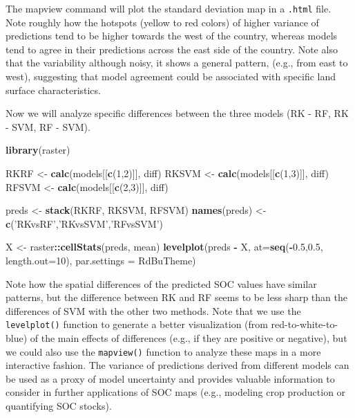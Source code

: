 \documentclass[10pt,b5paper,]{book}
\newenvironment{Shaded}{\begin{snugshade}}{\end{snugshade}}
\newcommand{\DataTypeTok}[1]{\textcolor[rgb]{0.13,0.29,0.53}{#1}}
\newcommand{\DecValTok}[1]{\textcolor[rgb]{0.00,0.00,0.81}{#1}}
\newcommand{\FloatTok}[1]{\textcolor[rgb]{0.00,0.00,0.81}{#1}}
\newcommand{\KeywordTok}[1]{\textcolor[rgb]{0.13,0.29,0.53}{\textbf{#1}}}
\newcommand{\NormalTok}[1]{#1}
\newcommand{\OperatorTok}[1]{\textcolor[rgb]{0.81,0.36,0.00}{\textbf{#1}}}
\newcommand{\StringTok}[1]{\textcolor[rgb]{0.31,0.60,0.02}{#1}}
\theoremstyle{definition}
\theoremstyle{definition}
\theoremstyle{definition}
\theoremstyle{remark}
\begin{document}
The mapview command will plot the standard deviation map in a
\texttt{.html} file. Note roughly how the hotspots (yellow to red
colors) of higher variance of predictions tend to be higher towards the
west of the country, whereas models tend to agree in their predictions
across the east side of the country. Note also that the variability
although noisy, it shows a general pattern, (e.g., from east to west),
suggesting that model agreement could be associated with specific land
surface characteristics.

Now we will analyze specific differences between the three models (RK -
RF, RK - SVM, RF - SVM).

\begin{Shaded}
\begin{Highlighting}[]
\KeywordTok{library}\NormalTok{(raster)}

\NormalTok{RKRF  <-}\StringTok{ }\KeywordTok{calc}\NormalTok{(models[[}\KeywordTok{c}\NormalTok{(}\DecValTok{1}\NormalTok{,}\DecValTok{2}\NormalTok{)]], diff)}
\NormalTok{RKSVM <-}\StringTok{ }\KeywordTok{calc}\NormalTok{(models[[}\KeywordTok{c}\NormalTok{(}\DecValTok{1}\NormalTok{,}\DecValTok{3}\NormalTok{)]], diff)}
\NormalTok{RFSVM <-}\StringTok{ }\KeywordTok{calc}\NormalTok{(models[[}\KeywordTok{c}\NormalTok{(}\DecValTok{2}\NormalTok{,}\DecValTok{3}\NormalTok{)]], diff)}

\NormalTok{preds <-}\StringTok{ }\KeywordTok{stack}\NormalTok{(RKRF, RKSVM, RFSVM)}
\KeywordTok{names}\NormalTok{(preds) <-}\StringTok{ }\KeywordTok{c}\NormalTok{(}\StringTok{'RKvsRF'}\NormalTok{,}\StringTok{'RKvsSVM'}\NormalTok{,}\StringTok{'RFvsSVM'}\NormalTok{)}

\NormalTok{X <-}\StringTok{ }\NormalTok{raster}\OperatorTok{::}\KeywordTok{cellStats}\NormalTok{(preds, mean)}
\KeywordTok{levelplot}\NormalTok{(preds }\OperatorTok{-}\StringTok{ }\NormalTok{X, }\DataTypeTok{at=}\KeywordTok{seq}\NormalTok{(}\OperatorTok{-}\FloatTok{0.5}\NormalTok{,}\FloatTok{0.5}\NormalTok{, }\DataTypeTok{length.out=}\DecValTok{10}\NormalTok{),}
          \DataTypeTok{par.settings =}\NormalTok{ RdBuTheme)}
\end{Highlighting}
\end{Shaded}

Note how the spatial differences of the predicted SOC values have
similar patterns, but the difference between RK and RF seems to be less
sharp than the differences of SVM with the other two methods. Note that
we use the \texttt{levelplot()} function to generate a better
visualization (from red-to-white-to-blue) of the main effects of
differences (e.g., if they are positive or negative), but we could also
use the \texttt{mapview()} function to analyze these maps in a more
interactive fashion. The variance of predictions derived from different
models can be used as a proxy of model uncertainty and provides valuable
information to consider in further applications of SOC maps (e.g.,
modeling crop production or quantifying SOC stocks).
\end{document}

